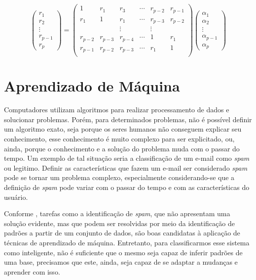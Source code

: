 \documentclass[
    12pt,
    oneside,
    a4paper,
    english,
    brazil
]{abntex2}
\begin{document}
\begin{equation}
    \label{eq:yulewalker}
    \begin{pmatrix}
        r_1\\
        r_2\\
        \vdots\\
        r_{p-1}\\
        r_p
    \end{pmatrix} =
    \begin{pmatrix}
        1 & r_1 & r_3 & \cdots & r_{p-2} & r_{p-1} \\
        r_1 & 1 & r_1 & \cdots & r_{p-3} & r_{p-2} \\
        & & \vdots & & \vdots & \\
        r_{p-2} & r_{p-3} & r_{p-4} & \cdots & 1 & r_1 \\
        r_{p-1} & r_{p-2} & r_{p-3} & \cdots & r_1 & 1 \\
    \end{pmatrix}
    \begin{pmatrix}
        \alpha_1\\
        \alpha_2\\
        \vdots\\
        \alpha_{p-1}\\
        \alpha_p
    \end{pmatrix}
\end{equation}

\section{Aprendizado de Máquina}

Computadores utilizam algoritmos  para realizar processamento de dados e
solucionar  problemas.  Porém,  para  determinados problemas,  não  é  possível
definir um  algoritmo exato, seja porque os seres humanos não conseguem  explicar seu
conhecimento, esse conhecimento é  muito complexo para ser  explicitado, ou,
ainda, porque  o conhecimento e a  solução do  problema muda  com o  passar do
tempo.  Um exemplo  de tal  situação seria  a classificação  de um  e-mail como
\textit{spam} ou legitimo.  Definir as características que fazem  um e-mail ser
considerado \textit{spam}  pode se  tornar um problema complexo, especialmente
considerando-se que  a definição  de \textit{spam}  pode variar  com o passar do
tempo e com as características do usuário.

Conforme , tarefas como a identificação de \textit{spam}, que
não apresentam  uma solução  evidente, mas  que podem  ser resolvidas  por meio
da  identificação  de padrões  a  partir  de um  conjunto  de  dados, são  boas
candidatas à aplicação de técnicas  de aprendizado de máquina. Entretanto, para
classificarmos esse sistema como inteligente, não é suficiente que o mesmo seja
capaz de inferir padrões de uma base, precisamos que este, ainda, seja capaz de
se adaptar a mudanças e aprender com isso.
\end{document}
